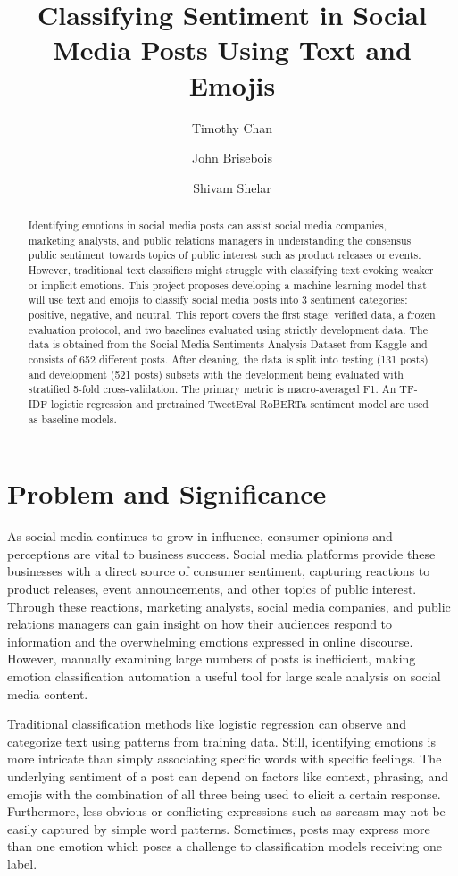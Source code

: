 \documentclass[sigconf,nonacm]{acmart}
\title{Classifying Sentiment in Social Media Posts Using Text and Emojis}
\author{Timothy Chan}
\affiliation{%
  \institution{San Jose State University}
  \city{San Jose}
  \state{California}
  \country{USA}}
\author{John Brisebois}
\affiliation{%
  \institution{San Jose State University}
  \city{San Jose}
  \state{California}
  \country{USA}}
\author{Shivam Shelar}
\affiliation{%
  \institution{San Jose State University}
  \city{San Jose}
  \state{California}
  \country{USA}}
\begin{document}
\begin{abstract}
Identifying emotions in social media posts can assist social media companies, marketing analysts, and public relations managers in understanding the consensus public sentiment towards topics of public interest such as product releases or events. However, traditional text classifiers might struggle with classifying text evoking weaker or implicit emotions. This project proposes developing a machine learning model that will use text and emojis to classify social media posts into 3 sentiment categories: positive, negative, and neutral. This report covers the first stage: verified data, a frozen evaluation protocol, and two baselines evaluated using strictly development data. The data is obtained from the Social Media Sentiments Analysis Dataset from Kaggle and consists of 652 different posts. After cleaning, the data is split into testing (131 posts) and development (521 posts) subsets with the development being evaluated with stratified 5-fold cross-validation. The primary metric is macro-averaged F1. An TF-IDF logistic regression and pretrained TweetEval RoBERTa sentiment model are used as baseline models.
\end{abstract}


\maketitle

\section{Problem and Significance}
As social media continues to grow in influence, consumer opinions and perceptions are vital to business success. Social media platforms provide these businesses with a direct source of consumer sentiment, capturing reactions to product releases, event announcements, and other topics of public interest. Through these reactions, marketing analysts, social media companies, and public relations managers can gain insight on how their audiences respond to information and the overwhelming emotions expressed in online discourse. However, manually examining large numbers of posts is inefficient, making emotion classification automation a useful tool for large scale analysis on social media content.

Traditional classification methods like logistic regression can observe and categorize text using patterns from training data. Still, identifying emotions is more intricate than simply associating specific words with specific feelings. The underlying sentiment of a post can depend on factors like context, phrasing, and emojis with the combination of all three being used to elicit a certain response. Furthermore, less obvious or conflicting expressions such as sarcasm may not be easily captured by simple word patterns. Sometimes, posts may express more than one emotion which poses a challenge to classification models receiving one label. 
\end{document}
